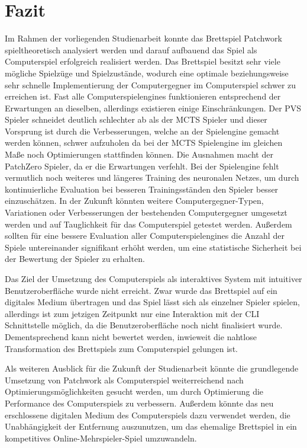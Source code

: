 \chapter{Fazit}
\label{chapter:fazit}

Im Rahmen der vorliegenden Studienarbeit konnte das Brettspiel Patchwork spieltheoretisch analysiert werden und darauf aufbauend das Spiel als Computerspiel erfolgreich realisiert werden. Das Brettspiel besitzt sehr viele mögliche Spielzüge und Spielzustände, wodurch eine optimale beziehungsweise sehr schnelle Implementierung der Computergegner im Computerspiel schwer zu erreichen ist. Fast alle Computerspielengines funktionieren entsprechend der Erwartungen an dieselben, allerdings existieren einige Einschränkungen. Der \ac{PVS} Spieler schneidet deutlich schlechter ab als der \ac{MCTS} Spieler und dieser Vorsprung ist durch die Verbesserungen, welche an der Spielengine gemacht werden können, schwer aufzuholen da bei der \ac{MCTS} Spielengine im gleichen Maße noch Optimierungen stattfinden können. Die Ausnahmen macht der PatchZero Spieler, da er die Erwartungen verfehlt. Bei der Spielengine fehlt vermutlich noch weiteres und längeres Training des neuronalen Netzes, um durch kontinuierliche Evaluation bei besseren Trainingsständen den Spieler besser einzuschätzen. In der Zukunft könnten weitere Computergegner-Typen, Variationen oder Verbesserungen der bestehenden Computergegner umgesetzt werden und auf Tauglichkeit für das Computerspiel getestet werden. Außerdem sollten für eine bessere Evaluation aller Computerspielengines die Anzahl der Spiele untereinander signifikant erhöht werden, um eine statistische Sicherheit bei der Bewertung der Spieler zu erhalten.

Das Ziel der Umsetzung des Computerspiels als interaktives System mit intuitiver Benutzeroberfläche wurde nicht erreicht. Zwar wurde das Brettspiel auf ein digitales Medium übertragen und das Spiel lässt sich als einzelner Spieler spielen, allerdings ist zum jetzigen Zeitpunkt nur eine Interaktion mit der \ac{CLI} Schnittstelle möglich, da die Benutzeroberfläche noch nicht finalisiert wurde. Dementsprechend kann nicht bewertet werden, inwieweit die nahtlose Transformation des Brettspiels zum Computerspiel gelungen ist.

Als weiteren Ausblick für die Zukunft der Studienarbeit könnte die grundlegende Umsetzung von Patchwork als Computerspiel weiterreichend nach Optimierungsmöglichkeiten gesucht werden, um durch Optimierung die Performance des Computerspiels zu verbessern. Außerdem könnte das neu erschlossene digitalen Medium des Computerspiels dazu verwendet werden, die Unabhängigkeit der Entfernung auszunutzen, um das ehemalige Brettspiel in ein kompetitives Online-Mehrspieler-Spiel umzuwandeln.